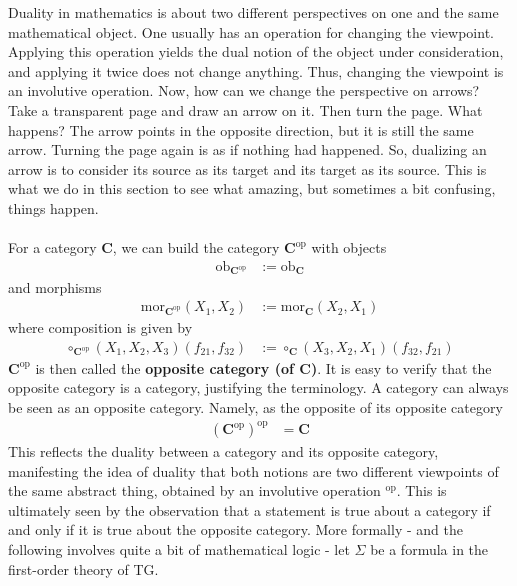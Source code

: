 Duality in mathematics is about two different perspectives on one and the same mathematical object.
One usually has an operation for changing the viewpoint.
Applying this operation yields the dual notion of the object under consideration, and applying it twice does not change anything.
Thus, changing the viewpoint is an involutive operation.
Now, how can we change the perspective on arrows?
Take a transparent page and draw an arrow on it.
Then turn the page.
What happens?
The arrow points in the opposite direction, but it is still the same arrow.
Turning the page again is as if nothing had happened.
So, dualizing an arrow is to consider its source as its target and its target as its source.
This is what we do in this section to see what amazing, but sometimes a bit confusing, things happen.
\\\\
For a category $\mathbf{C}$, we can build the category $\mathbf{C}^{\mathrm{op}}$ with objects
\begin{align*}
  \mathrm{ob}_{\mathbf{C}^{\mathrm{op}}}
  &:=
  \mathrm{ob}_{\mathbf{C}}
\end{align*}
and morphisms
\begin{align*}
  \mathrm{mor}_{\mathbf{C}^{\mathrm{op}}}(X_{1},X_{2})
  &:=
  \mathrm{mor}_{\mathbf{C}}(X_{2},X_{1})
\end{align*}
where composition is given by
\begin{align*}
  \circ_{\mathbf{C}^{\mathrm{op}}}
  (X_{1},X_{2},X_{3})
  (f_{21},f_{32})
  &:=
  \circ_{\mathbf{C}}
  (X_{3},X_{2},X_{1})
  (f_{32},f_{21})
\end{align*}
$\mathbf{C}^{\mathrm{op}}$ is then called the \textbf{opposite category (of $\mathbf{C}$)}.
It is easy to verify that the opposite category is a category, justifying the terminology.
A category can always be seen as an opposite category.
Namely, as the opposite of its opposite category
\begin{align*}
  \left(
    \mathbf{C}^{\mathrm{op}}
  \right)^{\mathrm{op}}
  &=
  \mathbf{C}
\end{align*}
This reflects the duality between a category and its opposite category, manifesting the idea of duality that both notions are two different viewpoints of the same abstract thing, obtained by an involutive operation $^{\mathrm{op}}$.
This is ultimately seen by the observation that a statement is true about a category if and only if it is true about the opposite category.
More formally - and the following involves quite a bit of mathematical logic - let $\Sigma$ be a formula in the first-order theory of TG.
